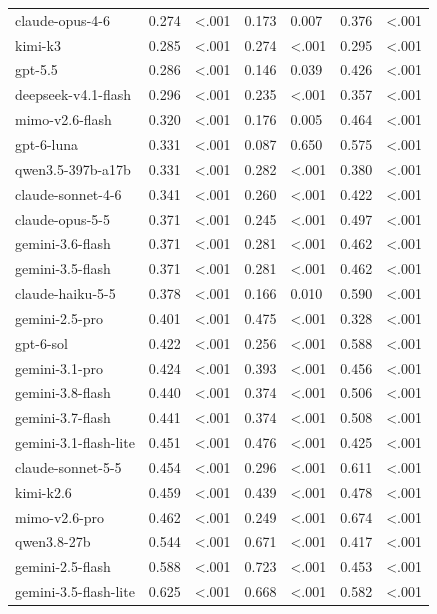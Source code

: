 \begin{table}
\begin{tabular}{lrlrlrl}
claude-opus-4-6 & 0.274 & <.001 & 0.173 & 0.007 & 0.376 & <.001 \\
kimi-k3 & 0.285 & <.001 & 0.274 & <.001 & 0.295 & <.001 \\
gpt-5.5 & 0.286 & <.001 & 0.146 & 0.039 & 0.426 & <.001 \\
deepseek-v4.1-flash & 0.296 & <.001 & 0.235 & <.001 & 0.357 & <.001 \\
mimo-v2.6-flash & 0.320 & <.001 & 0.176 & 0.005 & 0.464 & <.001 \\
gpt-6-luna & 0.331 & <.001 & 0.087 & 0.650 & 0.575 & <.001 \\
qwen3.5-397b-a17b & 0.331 & <.001 & 0.282 & <.001 & 0.380 & <.001 \\
claude-sonnet-4-6 & 0.341 & <.001 & 0.260 & <.001 & 0.422 & <.001 \\
claude-opus-5-5 & 0.371 & <.001 & 0.245 & <.001 & 0.497 & <.001 \\
gemini-3.6-flash & 0.371 & <.001 & 0.281 & <.001 & 0.462 & <.001 \\
gemini-3.5-flash & 0.371 & <.001 & 0.281 & <.001 & 0.462 & <.001 \\
claude-haiku-5-5 & 0.378 & <.001 & 0.166 & 0.010 & 0.590 & <.001 \\
gemini-2.5-pro & 0.401 & <.001 & 0.475 & <.001 & 0.328 & <.001 \\
gpt-6-sol & 0.422 & <.001 & 0.256 & <.001 & 0.588 & <.001 \\
gemini-3.1-pro & 0.424 & <.001 & 0.393 & <.001 & 0.456 & <.001 \\
gemini-3.8-flash & 0.440 & <.001 & 0.374 & <.001 & 0.506 & <.001 \\
gemini-3.7-flash & 0.441 & <.001 & 0.374 & <.001 & 0.508 & <.001 \\
gemini-3.1-flash-lite & 0.451 & <.001 & 0.476 & <.001 & 0.425 & <.001 \\
claude-sonnet-5-5 & 0.454 & <.001 & 0.296 & <.001 & 0.611 & <.001 \\
kimi-k2.6 & 0.459 & <.001 & 0.439 & <.001 & 0.478 & <.001 \\
mimo-v2.6-pro & 0.462 & <.001 & 0.249 & <.001 & 0.674 & <.001 \\
qwen3.8-27b & 0.544 & <.001 & 0.671 & <.001 & 0.417 & <.001 \\
gemini-2.5-flash & 0.588 & <.001 & 0.723 & <.001 & 0.453 & <.001 \\
gemini-3.5-flash-lite & 0.625 & <.001 & 0.668 & <.001 & 0.582 & <.001 \\
\bottomrule
\end{tabular}
\end{table}

